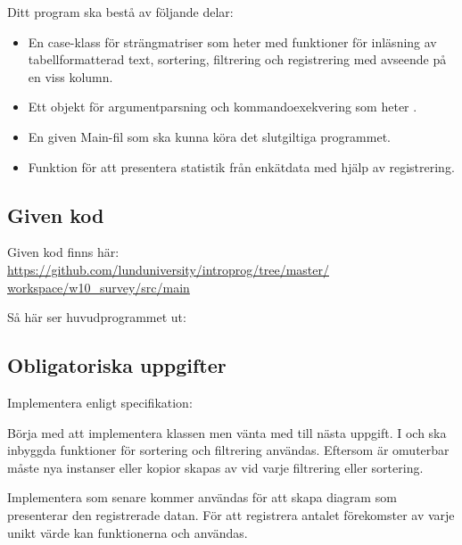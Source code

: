 \noindent Ditt program ska bestå av följande delar:
\begin{itemize}
\item En case-klass för strängmatriser som heter  med funktioner för inläsning av tabellformatterad text, sortering, filtrering och registrering med avseende på en viss kolumn.
\item Ett objekt för argumentparsning och kommandoexekvering som heter .
\item En given Main-fil som ska kunna köra det slutgiltiga programmet.
\item Funktion för att presentera statistik från enkätdata med hjälp av registrering.
\end{itemize}

\subsection{Given kod}

Given kod finns här: \\
\href{https://github.com/lunduniversity/introprog/tree/master/workspace/w10_survey/src/main}{https://github.com/lunduniversity/introprog/tree/master/\\workspace/w10\_survey/src/main}

\noindent Så här ser huvudprogrammet ut:



\subsection{Obligatoriska uppgifter}

\Task Implementera  enligt specifikation:


\Subtask Börja med att implementera klassen  men vänta med  till nästa uppgift. I  och  ska inbyggda funktioner för sortering och filtrering användas. Eftersom  är omuterbar måste nya instanser eller kopior skapas av  vid varje filtrering eller sortering.

\Subtask Implementera  som senare kommer användas för att skapa diagram som presenterar den registrerade datan. För att registrera antalet förekomster av varje unikt värde kan funktionerna  och  användas. 

